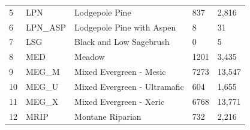 \begin{table}[!htbp]
\begin{tabular}{@{}lllll@{}}
\rowcolor[HTML]{CAD6BA} 
5                                                           & LPN                                                                & Lodgepole Pine                               & 837                                                         & 2,816                                                      \\
6                                                           & LPN\_ASP                                                           & Lodgepole Pine with Aspen                    & 8                                                           & 31                                                         \\
\rowcolor[HTML]{CAD6BA} 
7                                                           & LSG                                                                & Black and Low Sagebrush                      & 0                                                           & 5                                                          \\
8                                                           & MED                                                                & Meadow                                       & 1201                                                        & 3,435                                                      \\
\rowcolor[HTML]{CAD6BA} 
9                                                           & MEG\_M                                                             & Mixed Evergreen - Mesic                      & 7273                                                        & 13,547                                                     \\
10                                                          & MEG\_U                                                             & Mixed Evergreen - Ultramafic                 & 604                                                         & 1,655                                                      \\
\rowcolor[HTML]{CAD6BA} 
11                                                          & MEG\_X                                                             & Mixed Evergreen - Xeric                      & 6768                                                        & 13,771                                                     \\
12                                                          & MRIP                                                               & Montane Riparian                             & 732                                                         & 2,216                                                      \\

\end{tabular}
\end{table}
